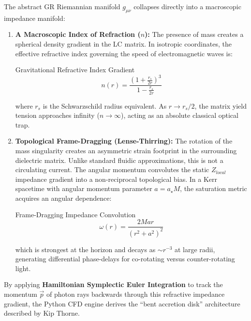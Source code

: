 The abstract GR Riemannian manifold $g_{\mu\nu}$ collapses directly into a macroscopic impedance manifold:
\begin{enumerate}
    \item \textbf{A Macroscopic Index of Refraction ($n$):} The presence of mass creates a spherical density gradient in the LC matrix. In isotropic coordinates, the effective refractive index governing the speed of electromagnetic waves is:
    \begin{resultbox}{Gravitational Refractive Index Gradient}
\begin{equation}
        n(r) = \frac{\left(1 + \frac{r_s}{2r}\right)^3}{1 - \frac{r_s}{2r}}
\end{equation}
\end{resultbox}
    where $r_s$ is the Schwarzschild radius equivalent. As $r \to r_s/2$, the matrix yield tension approaches infinity ($n \to \infty$), acting as an absolute classical optical trap.
    
    \item \textbf{Topological Frame-Dragging (Lense-Thirring):} The rotation of the mass singularity creates an asymmetric strain footprint in the surrounding dielectric matrix. Unlike standard fluidic approximations, this is not a circulating current. The angular momentum convolutes the static $Z_{local}$ impedance gradient into a non-reciprocal topological bias. In a Kerr spacetime with angular momentum parameter $a = a_\star M$, the saturation metric acquires an angular dependence:
    \begin{resultbox}{Frame-Dragging Impedance Convolution}
\begin{equation}
        \omega(r) = \frac{2Mar}{(r^2 + a^2)^2}
\end{equation}
\end{resultbox}
    which is strongest at the horizon and decays as $\sim r^{-3}$ at large radii, generating differential phase-delays for co-rotating versus counter-rotating light.
\end{enumerate}

By applying \textbf{Hamiltonian Symplectic Euler Integration} to track the momentum $\vec{p}$ of photon rays backwards through this refractive impedance gradient, the Python CFD engine derives the ``bent accretion disk'' architecture described by Kip Thorne.

